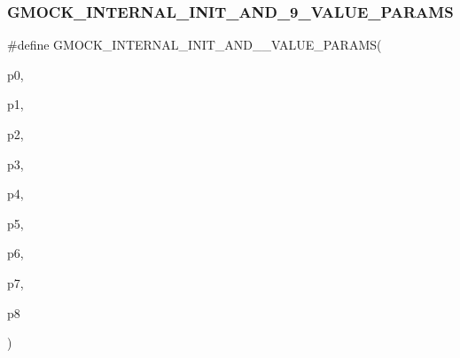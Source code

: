 \subsubsection{\texorpdfstring{GMOCK\_INTERNAL\_INIT\_AND\_9\_VALUE\_PARAMS}{GMOCK\_INTERNAL\_INIT\_AND\_9\_VALUE\_PARAMS}}
{\footnotesize\ttfamily \#define G\+M\+O\+C\+K\+\_\+\+I\+N\+T\+E\+R\+N\+A\+L\+\_\+\+I\+N\+I\+T\+\_\+\+A\+N\+D\+\_\+\_\+\+V\+A\+L\+U\+E\+\_\+\+P\+A\+R\+A\+MS(\begin{DoxyParamCaption}\item[{}]{p0,  }\item[{}]{p1,  }\item[{}]{p2,  }\item[{}]{p3,  }\item[{}]{p4,  }\item[{}]{p5,  }\item[{}]{p6,  }\item[{}]{p7,  }\item[{}]{p8 }\end{DoxyParamCaption})}

